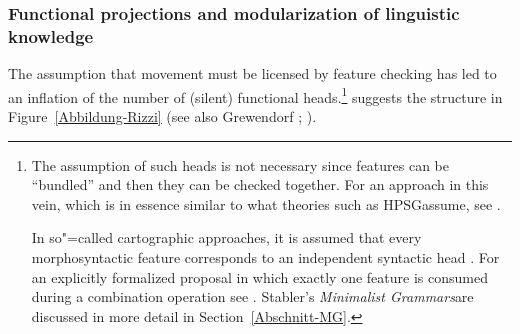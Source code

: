 \subsubsection{Functional projections and modularization of linguistic knowledge}

The assumption that movement must be licensed by feature checking has led to an inflation of the number of (silent) functional 
heads.\footnote{%
	The assumption of such heads is not necessary since features can be ``bundled'' and then they
        can be checked together. For an approach in this vein,
	which is in essence similar to what theories such as HPSG\indexhpsg assume, see .

In so"=called cartographic approaches, it is assumed that every morphosyntactic feature corresponds to an independent syntactic
head \citep[, 61]{CR2010a}. For an explicitly formalized proposal in which exactly one
feature is consumed during a combination operation see . Stabler's \emph{Minimalist
    Grammars}\indexmg are discussed in more detail in Section~\ref{Abschnitt-MG}.
} 
\citet[]{Rizzi97a-u} suggests the structure in Figure~\vref{Abbildung-Rizzi} (see also
Grewendorf \citeyear[, 240]{Grewendorf2002a}; \citeyear{Grewendorf2009a}).

